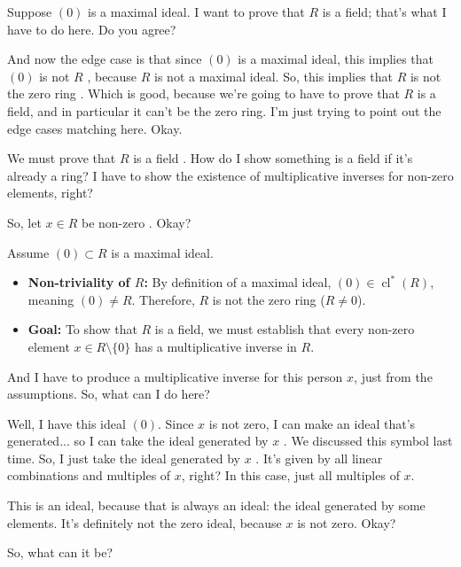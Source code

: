 \begin{speech}[00:16:51 - 00:18:05]
Suppose $(0)$ is a maximal ideal. I want to prove that $R$ is a field; that's what I have to do here. Do you agree?

And now the edge case is that since $(0)$ is a maximal ideal, this implies that $(0)$ is not $R$ , because $R$ is not a maximal ideal. So, this implies that $R$ is not the zero ring . Which is good, because we're going to have to prove that $R$ is a field, and in particular it can't be the zero ring. I'm just trying to point out the edge cases matching here. Okay.

We must prove that $R$ is a field . How do I show something is a field if it's already a ring? I have to show the existence of multiplicative inverses for non-zero elements, right?

So, let $x \in R$ be non-zero . Okay?
\end{speech}

\begin{content}
Assume $(0) \subset R$ is a maximal ideal.
\begin{itemize}
    \item \textbf{Non-triviality of $R$:} By definition of a maximal ideal, $(0) \in \operatorname{cl}^*(R)$, meaning $(0) \neq R$. Therefore, $R$ is not the zero ring ($R \neq 0$).
    \item \textbf{Goal:} To show that $R$ is a field, we must establish that every non-zero element $x \in R \setminus \{0\}$ has a multiplicative inverse in $R$.
\end{itemize}
\end{content}

\begin{speech}[00:18:05 - 00:19:16]
And I have to produce a multiplicative inverse for this person $x$, just from the assumptions. So, what can I do here?

Well, I have this ideal $(0)$. Since $x$ is not zero, I can make an ideal that's generated... so I can take the ideal generated by $x$ . We discussed this symbol last time. So, I just take the ideal generated by $x$ . It's given by all linear combinations and multiples of $x$, right? In this case, just all multiples of $x$.

This is an ideal, because that is always an ideal: the ideal generated by some elements. It's definitely not the zero ideal, because $x$ is not zero. Okay?

So, what can it be?
\end{speech}

